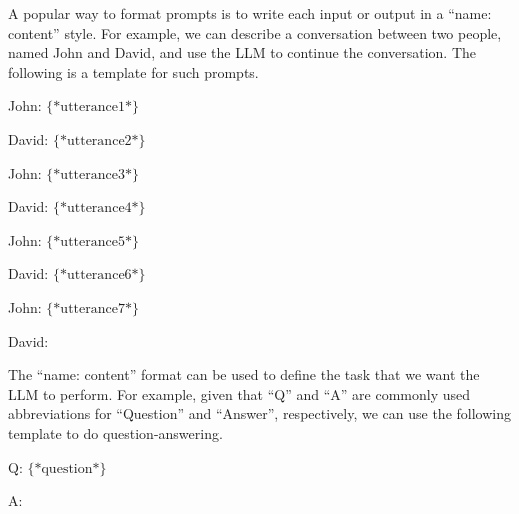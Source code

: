 A popular way to format prompts is to write each input or output in a ``name: content'' style. For example, we can describe a conversation between two people, named John and David, and use the LLM to continue the conversation. The following is a template for such prompts.

\vspace{0.5em}
\begin{tcolorbox}

\hspace{2em} John: $\{*\mathrm{utterance1}*\}$

\hspace{2em} David: $\{*\mathrm{utterance2}*\}$

\hspace{2em} John: $\{*\mathrm{utterance3}*\}$

\hspace{2em} David: $\{*\mathrm{utterance4}*\}$

\hspace{2em} John: $\{*\mathrm{utterance5}*\}$

\hspace{2em} David: $\{*\mathrm{utterance6}*\}$

\hspace{2em} John: $\{*\mathrm{utterance7}*\}$

\hspace{2em} David: \underline{\hspace{2em}}

\end{tcolorbox}
\vspace{0.5em}

The ``name: content'' format can be used to define the task that we want the LLM to perform. For example, given that ``Q'' and ``A'' are commonly used abbreviations for ``Question'' and ``Answer'', respectively, we can use the following template to do question-answering.

\vspace{0.5em}
\begin{tcolorbox}

\hspace{2em} Q: $\{*\mathrm{question}*\}$

\hspace{2em} A: \underline{\hspace{2em}}

\end{tcolorbox}
\vspace{0.5em}

